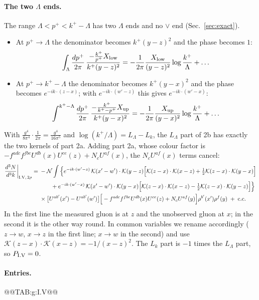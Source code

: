 \documentclass[10pt]{article}
\numberwithin{equation}{section}
\newcommand{\KK}{\mathcal K}
\newcommand{\NN}{\mathcal N}
\newcommand{\LL}{L_\Lambda}
\newcommand{\Lk}{L_k}
\begin{document}
\paragraph{The two $\Lambda$ ends.} The range $\Lambda<p^+<k^+-\Lambda$ has two $\Lambda$ ends and no $\vee$ end (Sec.~\ref{sec:exact}).
\begin{itemize}
\item At $p^+\to\Lambda$ the denominator becomes $k^+(y-z)^2$ and the phase becomes $1$:
\begin{equation}
\int_\Lambda\frac{dp^+}{2\pi}\,\frac{-\frac{k^+}{p^+}X_{\rm low}}{k^+(y-z)^2}=-\frac{1}{2\pi}\frac{X_{\rm low}}{(y-z)^2}\log\frac{k^+}{\Lambda}+\dots
\end{equation}
\item At $p^+\to k^+-\Lambda$ the denominator becomes $k^+(y-x)^2$ and the phase becomes $e^{-ik\cdot(z-x)}$; with $e^{-ik\cdot(w'-z)}$ this gives $e^{-ik\cdot(w'-x)}$:
\begin{equation}
\int^{k^+-\Lambda}\frac{dp^+}{2\pi}\,\frac{-\frac{k^+}{k^+-p^+}X_{\rm up}}{k^+(y-x)^2}=-\frac1{2\pi}\frac{X_{\rm up}}{(y-x)^2}\log\frac{k^+}{\Lambda}+\dots
\end{equation}
\end{itemize}
With $\frac{g^4}{8\pi^4}\cdot\frac1{2\pi}=\frac{g^4}{16\pi^5}$ and $\log(k^+/\Lambda)=\LL-\Lk$, the $\LL$ part of 2b has exactly the two kernels of part 2a. Adding part 2a, whose colour factor is $-f^{adc}f^{fbe}U^{db}(x)U^{ce}(z)+N_cU^{af}(x)$, the $N_cU^{af}(x)$ terms cancel:
\begin{align}
\frac{d^3N}{d^3k}\bigg|_{\rm I.V,\,2\rho}={}&-\NN\int\Big\{e^{-ik\cdot(w'-z)}\,\KK(x'-w')\cdot\KK(y-z)\Big[\KK(z-x)\cdot\KK(x-z)+\tfrac12\KK(z-x)\cdot\KK(y-x)\Big]\notag\\
&\qquad+e^{-ik\cdot(w'-x)}\,\KK(x'-w')\cdot\KK(y-x)\Big[\KK(z-x)\cdot\KK(x-z)-\tfrac12\KK(z-x)\cdot\KK(y-z)\Big]\Big\}\notag\\
&\times\big[U^{ab'}(x')-U^{ab'}(w')\big]\Big[-f^{adc}f^{fbe}U^{db}(x)U^{ce}(z)+N_cU^{af}(y)\Big]\rho^{b'}(x')\rho^f(y)\;+\;{\rm c.c.}
\label{eq:rowV}
\end{align}
In the first line the measured gluon is at $z$ and the unobserved gluon at $x$; in the second it is the other way round. In common variables we rename accordingly ($z\to w$, $x\to z$ in the first line; $x\to w$ in the second) and use $\KK(z-x)\cdot\KK(x-z)=-1/(x-z)^2$. The $\Lk$ part is $-1$ times the $\LL$ part, so $P_{\rm I.V}=0$.
\paragraph{Entries.}
@@TAB:g:I.V@@
\end{document}

